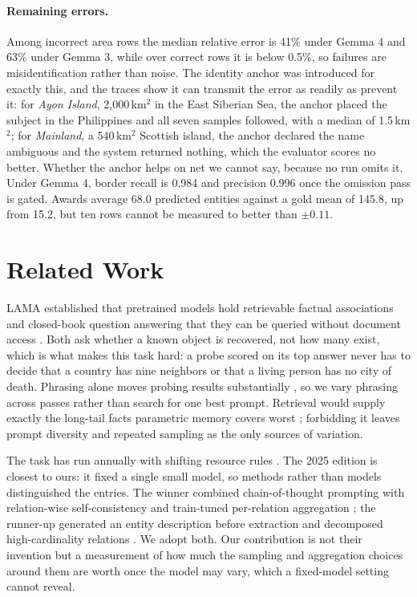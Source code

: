 \documentclass[11pt]{article}
\begin{document}
\paragraph{Remaining errors.}
Among incorrect area rows the median relative error is 41\% under Gemma 4 and
63\% under Gemma 3, while over correct rows it is below 0.5\%, so failures are
misidentification rather than noise. The identity anchor was introduced for
exactly this, and the traces show it can transmit the error as readily as
prevent it: for \emph{Ayon Island}, 2{,}000\,km$^2$ in the East Siberian Sea,
the anchor placed the subject in the Philippines and all seven samples
followed, with a median of 1.5\,km$^2$; for \emph{Mainland}, a 540\,km$^2$
Scottish island, the anchor declared the name ambiguous and the system
returned nothing, which the evaluator scores no better. Whether the anchor helps on net we cannot say,
because no run omits it. Under Gemma 4, border recall is 0.984 and precision
0.996 once the omission pass is gated. Awards average 68.0 predicted entities
against a gold mean of 145.8, up from 15.2, but ten rows cannot be measured to
better than $\pm0.11$.

\section{Related Work}
\label{sec:related-work}

LAMA established that pretrained models hold retrievable factual associations
\citep{petroni2019language} and closed-book question answering that they can be
queried without document access \citep{roberts2020knowledge}. Both ask whether a
known object is recovered, not how many exist, which is what makes this task
hard: a probe scored on its top answer never has to decide that a country has
nine neighbors or that a living person has no city of death. Phrasing alone
moves probing results substantially \citep{elazar2021pararel}, so we vary
phrasing across passes rather than search for one best prompt. Retrieval would
supply exactly the long-tail facts parametric memory covers worst
\citep{lewis2020rag,mallen2023popqa}; forbidding it leaves prompt diversity and
repeated sampling as the only sources of variation.

The task has run annually with shifting resource rules
\citep{kalo2024lmkbc,kalo2025lmkbc}. The 2025 edition is closest to ours: it
fixed a single small model, so methods rather than models distinguished the
entries. The winner combined chain-of-thought prompting with relation-wise
self-consistency and train-tuned per-relation aggregation
\citep{albertroulhac2025rewise}; the runner-up generated an entity description
before extraction and decomposed high-cardinality relations
\citep{he2025selfrag}. We adopt both. Our contribution is not their invention
but a measurement of how much the sampling and aggregation choices around them
are worth once the model may vary, which a fixed-model setting cannot reveal.
\end{document}
